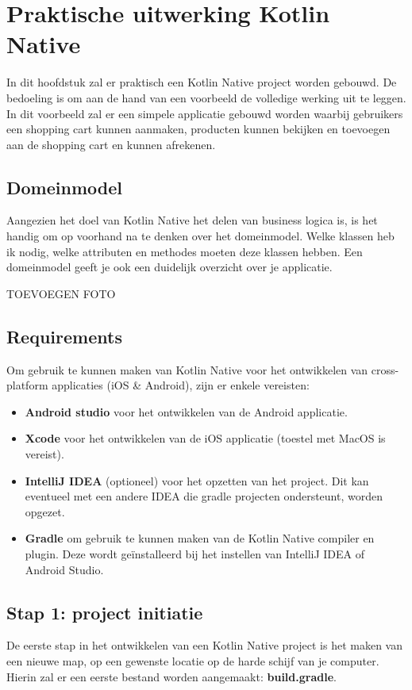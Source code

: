 \chapter{Praktische uitwerking Kotlin Native}
\label{ch:praktisch}
In dit hoofdstuk zal er praktisch een Kotlin Native project worden gebouwd. De bedoeling is om aan de hand van een voorbeeld de volledige werking uit te leggen. In dit voorbeeld zal er een simpele applicatie gebouwd worden waarbij gebruikers een shopping cart kunnen aanmaken, producten kunnen bekijken en toevoegen aan de shopping cart en kunnen afrekenen.

\section{Domeinmodel}
Aangezien het doel van Kotlin Native het delen van business logica is, is het handig om op voorhand na te denken over het domeinmodel. Welke klassen heb ik nodig, welke attributen en methodes moeten deze klassen hebben. Een domeinmodel geeft je ook een duidelijk overzicht over je applicatie.

TOEVOEGEN FOTO

\section{Requirements}
Om gebruik te kunnen maken van Kotlin Native voor het ontwikkelen van cross-platform applicaties (iOS \& Android), zijn er enkele vereisten:
\begin{itemize}
	\item \textbf{Android studio} voor het ontwikkelen van de Android applicatie.
	\item \textbf{Xcode} voor het ontwikkelen van de iOS applicatie (toestel met MacOS is vereist).
	\item \textbf{IntelliJ IDEA} (optioneel) voor het opzetten van het project. Dit kan eventueel met een andere IDEA die gradle projecten ondersteunt, worden opgezet.
	\item \textbf{Gradle} om gebruik te kunnen maken van de Kotlin Native compiler en plugin. Deze wordt geïnstalleerd bij het instellen van IntelliJ IDEA of Android Studio.
\end{itemize}

\section{Stap 1: project initiatie}
De eerste stap in het ontwikkelen van een Kotlin Native project is het maken van een nieuwe map, op een gewenste locatie op de harde schijf van je computer. Hierin zal er een eerste bestand worden aangemaakt: \textbf{build.gradle}.

